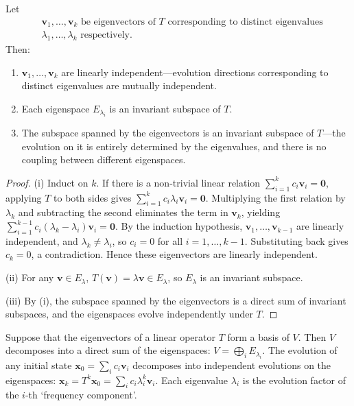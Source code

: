 \begin{theorem}\label{thm:eigenvector_invariant_subspace}
Let
\[
\begin{aligned}
&\mathbf{v}_1, \dots, \mathbf{v}_k \text{ be eigenvectors of } T \text{ corresponding to distinct eigenvalues} \\
&\lambda_1, \dots, \lambda_k \text{ respectively}.
\end{aligned}
\]
Then:
\begin{enumerate}[label=(\roman*)]
    \item $\mathbf{v}_1, \dots, \mathbf{v}_k$ are linearly independent---evolution directions corresponding to distinct eigenvalues are mutually independent.
    \item Each eigenspace $E_{\lambda_i}$ is an invariant subspace of $T$.
    \item The subspace spanned by the eigenvectors is an invariant subspace of $T$---the evolution on it is entirely determined by the eigenvalues, and there is no coupling between different eigenspaces.
\end{enumerate}
\end{theorem}

\begin{proof}
(i) Induct on $k$. If there is a non-trivial linear relation $\sum_{i=1}^k c_i \mathbf{v}_i = \mathbf{0}$, applying $T$ to both sides gives $\sum_{i=1}^k c_i \lambda_i \mathbf{v}_i = \mathbf{0}$. Multiplying the first relation by $\lambda_k$ and subtracting the second eliminates the term in $\mathbf{v}_k$, yielding $\sum_{i=1}^{k-1} c_i (\lambda_k - \lambda_i) \mathbf{v}_i = \mathbf{0}$. By the induction hypothesis, $\mathbf{v}_1, \dots, \mathbf{v}_{k-1}$ are linearly independent, and $\lambda_k \neq \lambda_i$, so $c_i = 0$ for all $i=1,\dots,k-1$. Substituting back gives $c_k = 0$, a contradiction. Hence these eigenvectors are linearly independent.

(ii) For any $\mathbf{v} \in E_\lambda$, $T(\mathbf{v}) = \lambda \mathbf{v} \in E_\lambda$, so $E_\lambda$ is an invariant subspace.

(iii) By (i), the subspace spanned by the eigenvectors is a direct sum of invariant subspaces, and the eigenspaces evolve independently under $T$.
\end{proof}

\begin{corollary}\label{cor:eigenspace_periodic_evolution}
Suppose that the eigenvectors of a linear operator $T$ form a basis of $V$. Then $V$ decomposes into a direct sum of the eigenspaces: $V = \bigoplus_i E_{\lambda_i}$. The evolution of any initial state $\mathbf{x}_0 = \sum_i c_i \mathbf{v}_i$ decomposes into independent evolutions on the eigenspaces: $\mathbf{x}_k = T^k \mathbf{x}_0 = \sum_i c_i \lambda_i^k \mathbf{v}_i$. Each eigenvalue $\lambda_i$ is the evolution factor of the $i$-th `frequency component'.
\end{corollary}

